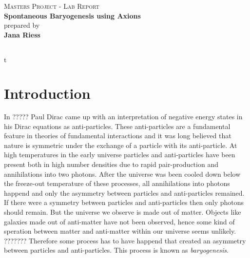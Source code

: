 \documentclass[13pt,a4paper,twoside,titlepage]{article}
\begin{document}
\begin{titlepage}

\vspace*{3cm}

\centering
\textsc{\Large Masters Project - Lab Report}
\\
\vspace*{1cm}
{\Large \bfseries
Spontaneous Baryogenesis using Axions
\\[0.1cm]}
\vspace*{1cm}
{
\centering\Large
prepared by\\[0.2cm]
{\bfseries Jana Riess}\\[0.2cm]
}

\vspace*{2cm}

\begin{Large}
\begin{tabular}{ll}
\end{tabular}
\end{Large}

\vspace*{1.5cm}

\end{titlepage}

\tableofcontents
\newpage

\newcommand{\jana}[1]{{\color{magenta}{#1}}}t


\section{Introduction}
\label{sec:introduction}

\noindent
\jana{Überarbeiten!!!!!}
In ????? Paul Dirac came up with an interpretation of negative energy states in his Dirac equations as anti-particles.
These anti-particles are a fundamental feature in theories of fundamental interactions and it was long believed that
nature is symmetric under the exchange of a particle with its anti-particle.
At high temperatures in the early universe particles and anti-particles have been present both in high number densities due to rapid pair-production and annihilations into two photons. After the universe was been cooled down below the freeze-out temperature of these processes, all annihilations into photons happend and only the asymmetry between particles and anti-particles remained. If
there were a symmetry between particles and anti-particles then only photons should remain.
But the universe we observe is made out of matter. Objects like galaxies made out of anti-matter have not been observed, hence some kind of speration between matter and anti-matter within our universe seems unlikely. ???????
Therefore some process has to have happend that created an asymmetry between particles and anti-particles. This process
is known as \emph{baryogenesis}.
\end{document}

